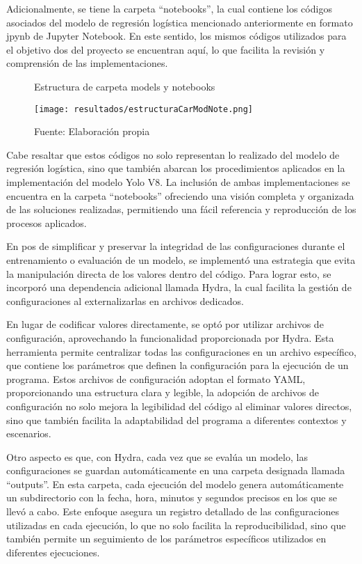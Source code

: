 Adicionalmente, se tiene la carpeta ``notebooks'', la cual contiene los códigos asociados del modelo de regresión logística mencionado anteriormente en formato jpynb de Jupyter Notebook. En este sentido, los mismos códigos utilizados para el objetivo dos del proyecto se encuentran aquí, lo que facilita la revisión y comprensión de las implementaciones.


\begin{figure}[h]
\centering
\caption{Estructura de carpeta models y notebooks}
\texttt{[image: resultados/estructuraCarModNote.png]}
\caption*{\footnotesize Fuente: Elaboración propia}
\label{fig:figuraEstructuraCarModNote}
\end{figure}

\newpage

Cabe resaltar que estos códigos no solo representan lo realizado del modelo de regresión logística, sino que también abarcan los procedimientos aplicados en la implementación del modelo Yolo V8. La inclusión de ambas implementaciones se encuentra en la carpeta ``notebooks'' ofreciendo una visión completa y organizada de las soluciones realizadas, permitiendo una fácil referencia y reproducción de los procesos aplicados. \newline

En pos de simplificar y preservar la integridad de las configuraciones durante el entrenamiento o evaluación de un modelo, se implementó una estrategia que evita la manipulación directa de los valores dentro del código. Para lograr esto, se incorporó una dependencia adicional llamada Hydra, la cual facilita la gestión de configuraciones al externalizarlas en archivos dedicados. \newline

En lugar de codificar valores directamente, se optó por utilizar archivos de configuración, aprovechando la funcionalidad proporcionada por Hydra. Esta herramienta permite centralizar todas las configuraciones en un archivo específico, que contiene los parámetros que definen la configuración para la ejecución de un programa. Estos archivos de configuración adoptan el formato YAML, proporcionando una estructura clara y legible, la adopción de archivos de configuración no solo mejora la legibilidad del código al eliminar valores directos, sino que también facilita la adaptabilidad del programa a diferentes contextos y escenarios. \newline

Otro aspecto es que, con Hydra, cada vez que se evalúa un modelo, las configuraciones se guardan automáticamente en una carpeta designada llamada ``outputs''. En esta carpeta, cada ejecución del modelo genera automáticamente un subdirectorio con la fecha, hora, minutos y segundos precisos en los que se llevó a cabo. Este enfoque asegura un registro detallado de las configuraciones utilizadas en cada ejecución, lo que no solo facilita la reproducibilidad, sino que también permite un seguimiento de los parámetros específicos utilizados en diferentes ejecuciones.

